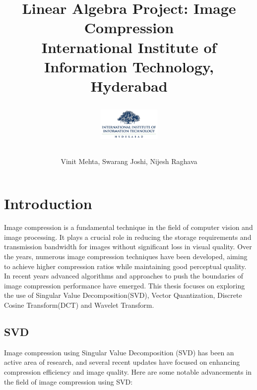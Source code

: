 \documentclass{article}
\begin{document}
\title{
    {Linear Algebra Project: Image Compression}\\
    {\large International Institute of Information Technology, Hyderabad}\\
    \author{Vinit Mehta, Swarang Joshi, Nijesh Raghava}
    \vspace{1cm}
    \includegraphics[width=3cm]{IIITH.png}
}
\date{}

\maketitle

\section{Introduction}
Image compression is a fundamental technique in the field of computer vision and image processing. It plays a crucial role in reducing the storage requirements and transmission bandwidth for images without significant loss in visual quality. Over the years, numerous image compression techniques have been developed, aiming to achieve higher compression ratios while maintaining good perceptual quality. In recent years advanced algorithms and approaches to push the boundaries of image compression performance have emerged. This thesis focuses on exploring the use of Singular Value Decomposition(SVD), Vector Quantization, Discrete Cosine Transform(DCT) and Wavelet Transform.

\subsection{SVD}
Image compression using Singular Value Decomposition (SVD) has been an active area of research, and several recent updates have focused on enhancing compression efficiency and image quality. Here are some notable advancements in the field of image compression using SVD:
\end{document}
